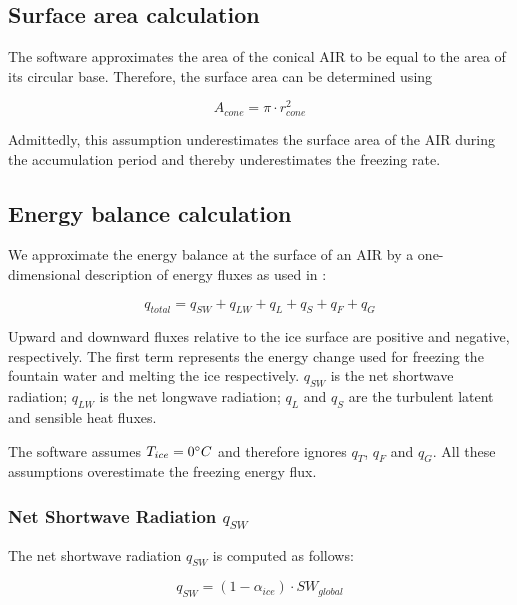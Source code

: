 \documentclass[utf8]{frontiersSCNS}
\begin{document}
\subsection{Surface area calculation} \label{sec:shape}

The software approximates the area of the conical AIR to be equal to the area of its circular base. Therefore,
the surface area can be determined using

\begin{equation} A_{cone} =\pi \cdot r_{cone}^2 \label{eq:Area} \end{equation}

Admittedly, this assumption underestimates the surface area of the AIR during the accumulation period and
thereby underestimates the freezing rate.

\subsection{Energy balance calculation} \label{sec:energy}

We approximate the energy balance at the surface of an AIR by a one-dimensional description of energy fluxes as
used in \cite{Balasubramanian_2022}:

\begin{equation}
	 q_{total} = q_{SW} + q_{LW} + q_{L} + q_{S} + q_{F} + q_{G}
	\label{eqn:EB}
\end{equation}

Upward and downward fluxes relative to the ice surface are positive and negative, respectively. The first
term represents the energy change used for freezing the fountain water and melting the ice respectively.
$q_{SW}$ is the net shortwave radiation; $q_{LW}$ is the net longwave radiation; $q_{L}$ and $q_{S}$ are the
turbulent latent and sensible heat fluxes. 

The software assumes $T_{ice} = 0 \degree C$ and therefore ignores $q_{T}$, $q_{F}$ and $q_{G}$. All these
assumptions overestimate the freezing energy flux.

\subsubsection{Net Shortwave Radiation \texorpdfstring{$q_{SW}$}{Lg}} \label{sec:SW}

The net shortwave radiation $q_{SW}$ is computed as follows:

\begin{equation} q_{SW} = (1- \alpha_{ice})\cdot SW_{global} \label{eqn:SW} \end{equation}
\end{document}
